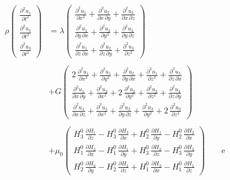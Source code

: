 \begin{align}\label{eq.disp_abertas_1}\nonumber
\rho
\begin{pmatrix}
\frac{\partial^2u_1}{\partial t^2}\\
\frac{\partial^2u_2}{\partial t^2}\\
\frac{\partial^2u_3}{\partial t^2}
\end{pmatrix}
&=\lambda
\begin{pmatrix}
\frac{\partial^2u_1}{\partial x^2}+\frac{\partial^2u_2}{\partial x\,\partial y}+\frac{\partial^2u_3}{\partial x\,\partial z}\\
\frac{\partial^2u_1}{\partial y\,\partial x}+\frac{\partial^2u_2}{\partial y^2}+\frac{\partial^2u_3}{\partial y\,\partial z}\\
\frac{\partial^2u_1}{\partial z\,\partial x}+\frac{\partial^2u_2}{\partial z\,\partial y}+\frac{\partial^2u_3}{\partial z^2}
\end{pmatrix}\\\nonumber\\
&+G
\begin{pmatrix}
2\,\frac{\partial^2u_1}{\partial x^2}+\frac{\partial^2u_1}{\partial y^2}+\frac{\partial^2u_2}{\partial y\,\partial x}+\frac{\partial^2u_1}{\partial z^2}+\frac{\partial^2u_3}{\partial z\,\partial x}\\
\frac{\partial^2u_1}{\partial x\,\partial y}+\frac{\partial^2u_2}{\partial x^2}+2\,\frac{\partial^2u_2}{\partial y^2}+\frac{\partial^2u_2}{\partial z^2}+\frac{\partial^2u_3}{\partial z\,\partial y}\\
\frac{\partial^2u_1}{\partial x\,\partial z}+\frac{\partial^2u_3}{\partial x^2}+\frac{\partial^2u_2}{\partial y\,\partial z}+\frac{\partial^2u_3}{\partial y^2}+2\,\frac{\partial^2u_3}{\partial z^2}
\end{pmatrix}\\\nonumber\\\nonumber
&+\mu_0
\begin{pmatrix}
H^0_3\,\frac{\partial H_1}{\partial z}-H^0_3\,\frac{\partial H_3}{\partial x}+H^0_2\,\frac{\partial H_1}{\partial y}-H^0_2\,\frac{\partial H_2}{\partial x}\\
H^0_1\,\frac{\partial H_2}{\partial x}-H^0_1\,\frac{\partial H_1}{\partial y}+H^0_3\,\frac{\partial H_2}{\partial z}-H^0_3\,\frac{\partial H_3}{\partial y}\\
H^0_2\,\frac{\partial H_3}{\partial y}-H^0_2\,\frac{\partial H_2}{\partial z}+H^0_1\,\frac{\partial H_3}{\partial x}-H^0_1\,\frac{\partial H_1}{\partial z}
\end{pmatrix}\qquad\text{e}
\end{align}

